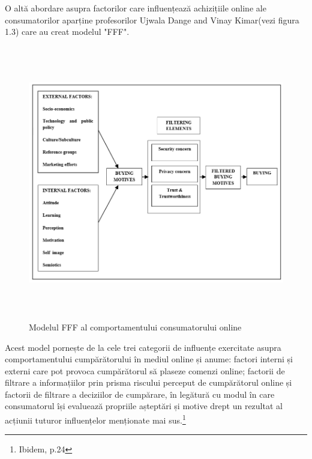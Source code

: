 \documentclass[a4paper, 12pt]{article}
\begin{document}
	\quad  O altă abordare asupra factorilor care influențează achizițiile online ale consumatorilor aparține profesorilor Ujwala Dange and Vinay Kimar(vezi figura 1.3) care au creat modelul "FFF". 
	\begin{figure}[!htb]
		\centering
		\includegraphics[width=15cm, height=12cm]{"figures/SECOND.png"}
		\caption{Modelul FFF al comportamentului consumatorului online}\label{fig:second}
	\end{figure}
\newpage
	\quad Acest model pornește de la cele trei categorii de influențe exercitate asupra comportamentului cumpărătorului în mediul online și anume: factori interni și externi care pot provoca cumpărătorul să plaseze comenzi online; factorii de filtrare a informațiilor prin prisma riscului perceput de cumpărătorul online și factorii de filtrare a deciziilor de cumpărare, în legătură cu modul în care consumatorul își evaluează propriile așteptări și motive drept un rezultat al acțiunii tuturor influențelor menționate mai sus.\footnote{Ibidem, p.24}
	
\end{document}
